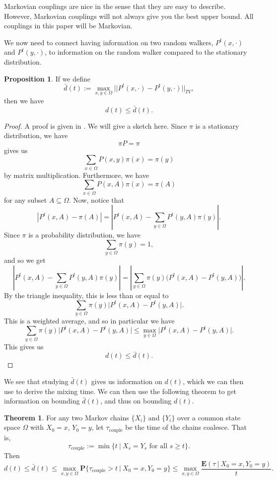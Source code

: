 \documentclass[10pt,a4paper]{amsart}
\theoremstyle{definition}
\numberwithin{definition}{section}
\newtheorem{theorem}[definition]{Theorem}
\newtheorem{proposition}[definition]{Proposition}
\begin{document}
\noindent Markovian couplings are nice in the sense that they are easy to describe. However, Markovian couplings will not always give you the best upper bound. All couplings in this paper will be Markovian.

We now need to connect having information on two random walkers, $P^t(x, \cdot)$ and $P^t(y, \cdot)$, to information on the random walker compared to the stationary distribution.

\begin{proposition}\label{prop:1}
If we define 
\[ \bar{d}(t) := \max_{x,y \in \Omega } ||P^t(x, \cdot) - P^t(y, \cdot)||_{TV},\]
then we have 
\[ d(t) \leq \bar{d}(t).\]
\end{proposition}

\begin{proof}
A proof is given in \cite{LevinPeresWilmer2006}. We will give a sketch here. Since $\pi$ is a stationary distribution, we have 
\[ \pi P = \pi \]
gives us 
\[ \sum_{x \in \Omega} P(x,y) \pi(x) = \pi(y) \]
by matrix multiplication. Furthermore, we have 
\[ \sum_{x \in \Omega} P(x, A) \pi(x) = \pi(A) \]
for any subset $A \subseteq \Omega$. Now, notice that 
\[|P^t(x,A) - \pi(A)| = \left|P^t(x,A) - \sum_{y \in \Omega}P^t(y,A)\pi(y) \right|. \]
Since $\pi$ is a probability distribution, we have
\[\sum_{y \in \Omega} \pi(y) = 1, \]
and so we get
\[ \left|P^t(x,A) - \sum_{y \in \Omega}P^t(y,A)\pi(y)\right| = \left|\sum_{y \in \Omega} \pi(y) \big(P^t(x, A) - P^t(y, A) \big) \right|. \]
By the triangle inequality, this is less than or equal to 
\[ \sum_{y \in \Omega} \pi(y) \big| P^t(x, A) - P^t(y, A) \big|. \]
This is a weighted average, and so in particular we have
\[\sum_{y \in \Omega} \pi(y) \big| P^t(x,A) - P^t(y,A) \big| \leq \max_{y \in \Omega} \big| P^t(x,A) - P^t(y,A) \big| .\] 
This gives us  
\[ d(t) \leq \bar{d}(t).\]
\end{proof}

We see that studying $\bar{d}(t)$ gives us information on $d(t)$, which we can then use to derive the mixing time. We can then use the following theorem to get information on bounding $\bar{d}(t)$, and thus on bounding $d(t)$.

\begin{theorem}\label{thm:2}
For any two Markov chains $\{X_i\}$ and $\{Y_i\}$ over a common state space $\Omega$ with $X_0 = x$, $Y_0 = y$, let $\tau_{\text{couple}}$ be the time of the chains coalesce. That is, 
\[\tau_{\text{couple}} := \min \{t \ | \ X_s = Y_s \text{ for all } s \geq t \}. \]
Then 
\[ d(t) \leq \bar{d}(t) \leq \max_{x,y \in \Omega} \mathbf{P} \{\tau_{\text{couple}} > t \ | \ X_0 = x, Y_0 = y\} \leq \max_{x, y \in \Omega} \frac{\mathbf{E}(\tau \ | \ X_0 = x, Y_0 = y)}{t}.\]
\end{theorem}
\end{document}
